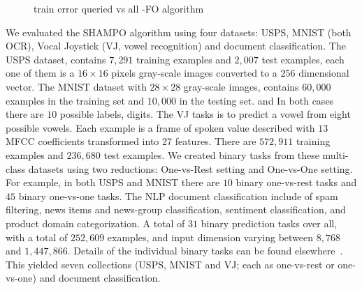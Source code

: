 \begin{figure}[!t]
\begin{centering}
\caption{train error queried vs all -FO algorithm}
\end{centering}
\vspace{-0.5cm}
\end{figure}

We evaluated the SHAMPO algorithm using four datasets: USPS, MNIST (both OCR), Vocal Joystick 
(VJ, vowel recognition) and document classification. 
The USPS dataset, contains $7,291$ training examples and $2,007$ test examples, each one of them is a 
$16\times16$ pixels gray-scale images converted to a $256$ dimensional vector. 
The MNIST dataset with $28\times28$ gray-scale images, contains $60,000$ 
examples in the training set and $10,000$ in the testing set. and  In both cases there are $10$ possible labels, digits. The VJ tasks is to predict a vowel from 
eight possible vowels. Each example is a frame of spoken value described with $13$ MFCC coefficients 
transformed into 27 features. There are $572,911$ training examples and $236,680$ test examples. 
We created binary tasks from these multi-class datasets using two reductions: One-vs-Rest setting and 
One-vs-One setting. For example, in both USPS and MNIST there are $10$ binary one-vs-rest tasks and 
$45$ binary one-vs-one tasks.  The NLP document classification include of spam filtering, news items and 
news-group classification, sentiment classification, and product domain categorization. 
A total of $31$ binary prediction tasks over all, with a total of $252,609$ examples, and input dimension 
varying between $8,768$ and $1,447,866$. Details of the individual binary tasks can be found 
elsewhere~\cite{Crammer:2012:CLC:2343676.2343704}.
This yielded seven collections (USPS, MNIST and VJ; each as one-vs-rest or one-vs-one) and document 
classification.

